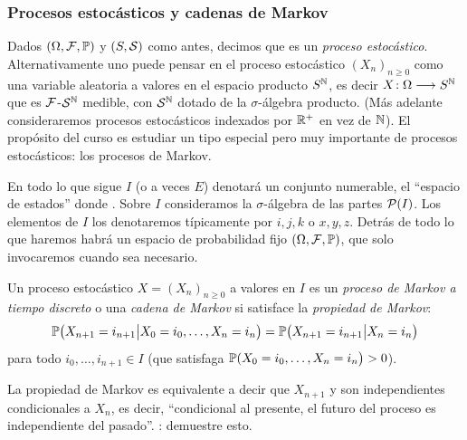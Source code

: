\subsubsection{Procesos estocásticos y cadenas de Markov}

Dados $(\Omega,\mathcal{F},\mathbb{P})$ y $(S,\mathcal{S})$ como antes, decimos que  es un \emph{proceso estocástico}.
Alternativamente uno puede pensar en el proceso estocástico $(X_n)_{n\geq0}$ como una variable aleatoria a valores en el espacio producto $S^{\mathbb{N}}$, es decir $X\!:\Omega\longrightarrow S^{\mathbb{N}}$ que es $\mathcal{F}$-$\mathcal{S}^{\mathbb{N}}$ medible, con $\mathcal{S}^{\mathbb{N}}$ dotado de la $\sigma$-álgebra producto.
\lsep
(Más adelante consideraremos procesos estocásticos indexados por $\mathbb{R}^+$ en vez de $\mathbb{N}$).
\lsep
El propósito del curso es estudiar un tipo especial pero muy importante de procesos estocásticos: los procesos de Markov.

\vs

En todo lo que sigue $I$ (o a veces $E$) denotará un conjunto numerable, el ``espacio de estados'' donde .
Sobre $I$ consideramos la $\sigma$-álgebra de las partes $\mathcal{P}(I)$.
Los elementos de $I$ los denotaremos típicamente por $i,j,k$ o $x,y,z$.
Detrás de todo lo que haremos habrá un espacio de probabilidad fijo $(\Omega,\mathcal{F},\mathbb{P})$, que solo invocaremos cuando sea necesario.

\begin{defn}
Un proceso estocástico $X=(X_n)_{n\geq0}$ a valores en $I$ es un \emph{proceso de Markov a tiempo discreto} o una \emph{cadena de Markov} si satisface la \emph{propiedad de Markov}:
\begin{equation}\label{eq:propMarkov}
\mathbb{P}\big(X_{n+1}=i_{n+1}\big|X_0=i_0,\dotsc,X_{n}=i_{n}\big)=\mathbb{P}\big(X_{n+1}=i_{n+1}\big|X_{n}=i_{n}\big)
\end{equation}
para todo $i_0,\dotsc,i_{n+1}\in I$ (que satisfaga $\mathbb{P}(X_0=i_0,\dotsc,X_{n}=i_{n}\big)>0$).
\end{defn}

\begin{rem}
La propiedad de Markov es equivalente a decir que $X_{n+1}$ y  son independientes condicionales a $X_n$, es decir, ``condicional al presente, el futuro del proceso es independiente del pasado''.
\uexer: demuestre esto.
\end{rem}


